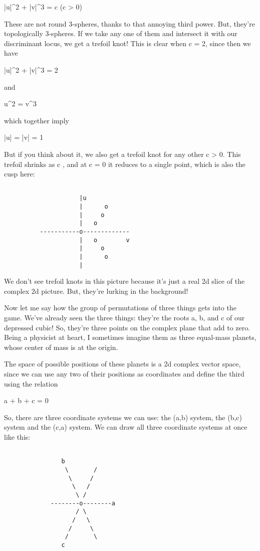 |u|^{2} + |v|^{3} = c                    (c > 0)

These are not round 3-spheres, thanks to that annoying third power.
But, they're topologically 3-spheres.  If we take any one of them 
and intersect it with our discriminant locus, we get a trefoil knot!  
This is clear when c = 2, since then we have

|u|^{2} + |v|^{3} = 2

and 

u^{2} = v^{3}

which together imply 

|u| = |v| = 1

But if you think about it, we also get a trefoil knot for any other
c > 0.  This trefoil shrinks as c , and at c = 0 it reduces to a 
single point, which is also the cusp here:


\begin{verbatim}

                     |u         
                     |      o
                     |     o
                     |   o
          -----------o-------------
                     |   o        v
                     |     o
                     |      o
                     |          
\end{verbatim}
    
We don't see trefoil knots in this picture because it's just a
real 2d slice of the complex 2d picture.  But, they're lurking in
the background!  

Now let me say how the group of permutations of three things
gets into the game.  We've already seen the three things: they're 
the roots a, b, and c of our depressed cubic!  So, they're three
points on the complex plane that add to zero.  Being a physicist
at heart, I sometimes imagine them as three equal-mass planets, 
whose center of mass is at the origin.

The space of possible positions of these planets is a 2d complex
vector space, since we can use any two of their positions as 
coordinates and define the third using the relation

a + b + c = 0

So, there are three coordinate systems we can use: the (a,b)
system, the (b,c) system and the (c,a) system.  We can draw all 
three coordinate systems at once like this:


\begin{verbatim}

                b         
                 \       /
                  \     /
                   \   /
                    \ /
             --------o--------a
                    / \
                   /   \
                  /     \
                 /       \
                c
\end{verbatim}
    
